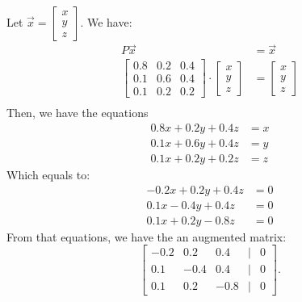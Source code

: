 \documentclass{article}
\begin{document}
\begin{enumerate}[label = ({\alph*})]
            Let \(\vec{x} = \begin{bmatrix} x \\ y \\ z \end{bmatrix}\). We have:
            \begin{align*}
                P\vec{x} &= \vec{x} \\
                \begin{bmatrix}
                    0.8 & 0.2 & 0.4 \\
                    0.1 & 0.6 & 0.4 \\
                    0.1 & 0.2 & 0.2
                \end{bmatrix}
                \cdot
                \begin{bmatrix}
                    x \\
                    y \\
                    z
                \end{bmatrix}
                &= 
                \begin{bmatrix}
                    x \\
                    y \\
                    z
                \end{bmatrix}\\
            \end{align*}
            Then, we have the equations
            \begin{align*}
                0.8x + 0.2y + 0.4z &= x \\
                0.1x + 0.6y + 0.4z &= y \\
                0.1x + 0.2y + 0.2z &= z
            \end{align*}
            Which equals to:
            \begin{align*}
                -0.2x + 0.2y + 0.4z &= 0 \\
                0.1x - 0.4y + 0.4z &= 0 \\
                0.1x + 0.2y - 0.8z &= 0
            \end{align*}
            From that equations, we have the an augmented matrix:
            \[
            \begin{bmatrix}
            -0.2 & 0.2 & 0.4 & | & 0 \\
            0.1 & -0.4 & 0.4 & | & 0 \\
            0.1 & 0.2 & -0.8 & | & 0
            \end{bmatrix}.
\]
\end{enumerate}
\end{document}
